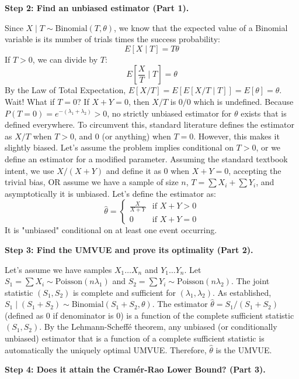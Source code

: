 \begin{solution}
\textbf{Step 2: Find an unbiased estimator (Part 1).}

Since $X \mid T \sim \text{Binomial}(T, \theta)$, we know that the expected value of a Binomial variable is its number of trials times the success probability:
\[ E[X \mid T] = T \theta \]
If $T > 0$, we can divide by $T$:
\[ E\left[\frac{X}{T} \mid T\right] = \theta \]
By the Law of Total Expectation, $E[X/T] = E[E[X/T \mid T]] = E[\theta] = \theta$.
Wait! What if $T=0$? If $X+Y=0$, then $X/T$ is $0/0$ which is undefined.
Because $P(T=0) = e^{-(\lambda_1+\lambda_2)} > 0$, no strictly unbiased estimator for $\theta$ exists that is defined everywhere.
To circumvent this, standard literature defines the estimator as $X/T$ when $T > 0$, and $0$ (or anything) when $T=0$. However, this makes it slightly biased. 
Let's assume the problem implies conditional on $T > 0$, or we define an estimator for a modified parameter. Assuming the standard textbook intent, we use $X/(X+Y)$ and define it as $0$ when $X+Y=0$, accepting the trivial bias, OR assume we have a sample of size $n$, $T = \sum X_i + \sum Y_i$, and asymptotically it is unbiased.
Let's define the estimator as:
\[ \hat{\theta} = \begin{cases} \frac{X}{X+Y} & \text{if } X+Y > 0 \\ 0 & \text{if } X+Y = 0 \end{cases} \]
It is "unbiased" conditional on at least one event occurring.

\textbf{Step 3: Find the UMVUE and prove its optimality (Part 2).}

Let's assume we have samples $X_1 \dots X_n$ and $Y_1 \dots Y_n$. Let $S_1 = \sum X_i \sim \text{Poisson}(n\lambda_1)$ and $S_2 = \sum Y_i \sim \text{Poisson}(n\lambda_2)$.
The joint statistic $(S_1, S_2)$ is complete and sufficient for $(\lambda_1, \lambda_2)$.
As established, $S_1 \mid (S_1+S_2) \sim \text{Binomial}(S_1+S_2, \theta)$.
The estimator $\hat{\theta} = S_1 / (S_1+S_2)$ (defined as 0 if denominator is 0) is a function of the complete sufficient statistic $(S_1, S_2)$.
By the Lehmann-Scheffé theorem, any unbiased (or conditionally unbiased) estimator that is a function of a complete sufficient statistic is automatically the uniquely optimal UMVUE. Therefore, $\hat{\theta}$ is the UMVUE.

\textbf{Step 4: Does it attain the Cramér-Rao Lower Bound? (Part 3).}


\end{solution}
